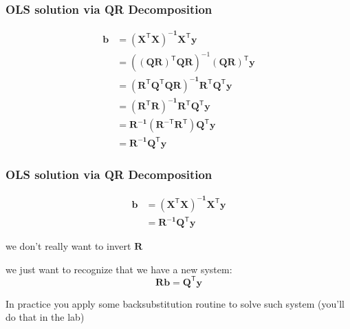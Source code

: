 \documentclass[12pt]{beamer}\usepackage[]{graphicx}\usepackage[]{color}
\begin{document}

\begin{frame}
\frametitle{OLS solution via QR Decomposition}

\begin{align*}
\mathbf{b} &= \mathbf{(X^\mathsf{T} X)^{-1} X^\mathsf{T} y} \\
 &= \left ( \mathbf{(QR)^\mathsf{T} QR} \right )^{-1} (\mathbf{QR})^\mathsf{T} \mathbf{y} \\
 &= \mathbf{(R^\mathsf{T} Q^\mathsf{T} Q R)^{-1} R^\mathsf{T} Q^\mathsf{T} y} \\
 &= \mathbf{(R^\mathsf{T} R)^{-1} R^\mathsf{T} Q^\mathsf{T} y} \\
 &= \mathbf{R^{-1} (R^{-\mathsf{T}} R^\mathsf{T}) Q^\mathsf{T} y} \\
 &= \mathbf{R^{-1} Q^\mathsf{T} y} 
\end{align*}

\end{frame}


\begin{frame}
\frametitle{OLS solution via QR Decomposition}

\begin{align*}
\mathbf{b} &= \mathbf{(X^\mathsf{T} X)^{-1} X^\mathsf{T} y} \\
 &= \mathbf{R^{-1} Q^\mathsf{T} y} 
\end{align*}

\bi
  \item we don't really want to invert $\mathbf{R}$
  \item we just want to recognize that we have a new system:
  $$
  \mathbf{R b} = \mathbf{Q^\mathsf{T} y}
  $$
  \item In practice you apply some backsubstitution routine to solve such system 
  {\lolit (you'll do that in the lab)}
\ei

\end{frame}


\begin{frame}
\begin{center}
\Huge{}
\end{center}
\end{frame}

\end{document}
